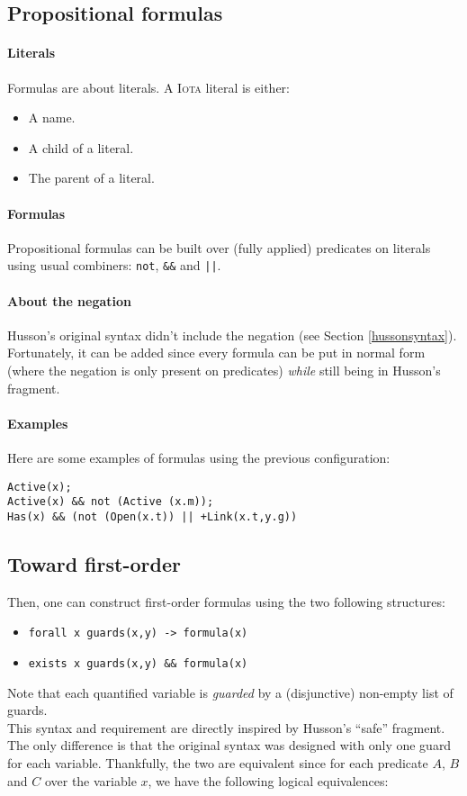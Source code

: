 \documentclass[10pt,a4paper]{article}
\newcommand\Iota{\textsc{Iota}}
\newcommand{\ocaml}{\texttt}
\begin{document}
\subsection{Propositional formulas}
\paragraph{Literals}
Formulas are about literals. A \Iota{} literal is either:
\begin{multicols}{2}
  \begin{itemize}
  \item A name.
  \item A child of a literal.
  \item The parent of a literal.
  \end{itemize}
\end{multicols}

\paragraph{Formulas}
Propositional formulas can be built over (fully applied) predicates on literals using usual combiners: \ocaml{not}, \ocaml{&&} and \ocaml{||}.

\paragraph{About the negation}
Husson's original syntax didn't include the negation (see Section \ref{hussonsyntax}). Fortunately, it can be added since every formula can be put in normal form (where the negation is only present on predicates) \emph{while} still being in Husson's fragment.

\paragraph{Examples}
Here are some examples of formulas using the previous configuration:
\begin{verbatim}
Active(x);
Active(x) && not (Active (x.m));
Has(x) && (not (Open(x.t)) || +Link(x.t,y.g))
\end{verbatim}

\subsection{Toward first-order}
Then, one can construct first-order formulas using the two following structures:
\begin{itemize}
\item \ocaml{forall x guards(x,y) -> formula(x)}
\item \ocaml{exists x guards(x,y) && formula(x)}
\end{itemize}
Note that each quantified variable is \emph{guarded} by a (disjunctive) non-empty list of guards.\\
This syntax and requirement are directly inspired by Husson's ``safe'' fragment. The only difference is that the original syntax was designed with only one guard for each variable. Thankfully, the two are equivalent since for each predicate $A$, $B$ and $C$ over the variable $x$, we have the following logical equivalences:
\end{document}
